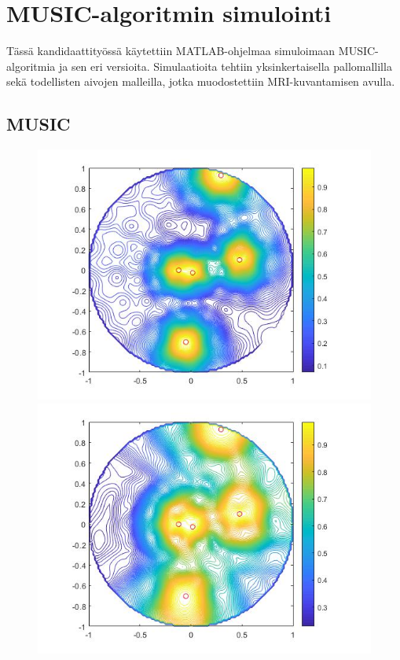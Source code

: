 \section{MUSIC-algoritmin simulointi}
Tässä kandidaattityössä käytettiin MATLAB-ohjelmaa simuloimaan MUSIC-algoritmia ja sen eri versioita. Simulaatioita tehtiin yksinkertaisella pallomallilla sekä todellisten aivojen malleilla, jotka muodostettiin MRI-kuvantamisen avulla.



\subsection{MUSIC}
\begin{figure}[h]
    \centering
    \begin{minipage}{0.45\textwidth}
        \centering
        \includegraphics[width=1\textwidth]{MUSICfix.jpg}
    \end{minipage}\hfill
    \begin{minipage}{0.45\textwidth}
        \centering
        \includegraphics[width=1\textwidth]{MUSICfree.jpg} 

\end{minipage}
\end{figure}
